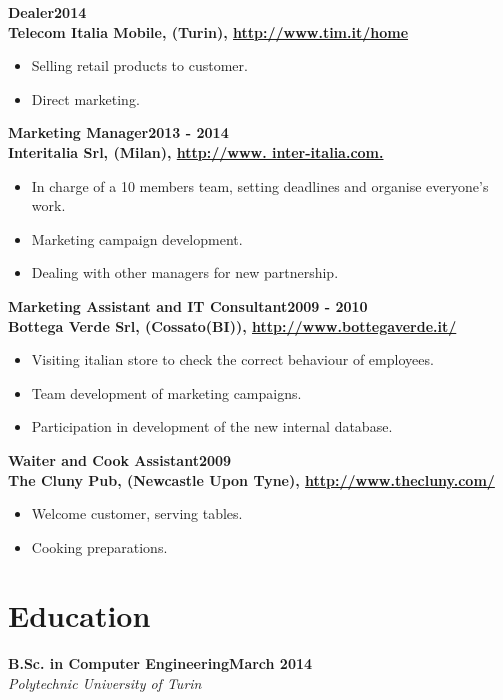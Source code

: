 \documentclass[a4paper,sans,10pt]{moderncv} %
\newcommand{\education}{Education}
\begin{document}
\vspace{0.5em}
  \textbf{Dealer}\hfill\textbf{2014}\\
  \textbf{Telecom Italia Mobile, (Turin), \url{http://www.tim.it/home}}\\
\vspace{-1em}
  \begin{itemize}
  \item Selling retail products to customer. 
  \item Direct marketing.
  \end{itemize}
  
  \vspace{0.5em}
  \textbf{Marketing Manager}\hfill\textbf{2013 - 2014}\\
  \textbf{Interitalia Srl, (Milan), \url{http://www. inter-italia.com.}}\\
\vspace{-1em}
  \begin{itemize}
  \item In charge of a 10 members team, setting deadlines and organise everyone's work.
  \item Marketing campaign development.
  \item Dealing with other managers for new partnership.
  \end{itemize}
  
\vspace{0.5em}
  \textbf{Marketing Assistant and IT Consultant}\hfill\textbf{2009 - 2010}\\
  \textbf{Bottega Verde Srl, (Cossato(BI)), \url{http://www.bottegaverde.it/}}\\
\vspace{-1em}
  \begin{itemize}
  \item Visiting italian store to check the correct behaviour of employees. 
  \item Team development of marketing campaigns.
  \item Participation in development of the new internal database.
  \end{itemize}  
  
\vspace{0.5em}
  \textbf{Waiter and Cook Assistant}\hfill\textbf{2009}\\
  \textbf{The Cluny Pub, (Newcastle Upon Tyne), \url{http://www.thecluny.com/}}\\
\vspace{-1em}
  \begin{itemize}
  \item Welcome customer, serving tables. 
  \item Cooking preparations.
  \end{itemize} 

\section{\education}

  \textbf{B.Sc. in  Computer Engineering}\hfill\textbf{March 2014}\\
  \textit{Polytechnic University of Turin}
\end{document}
